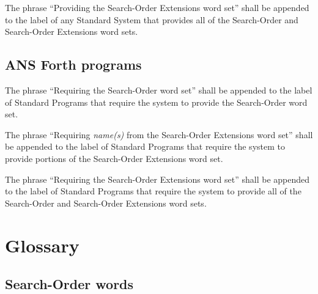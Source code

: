 The phrase ``Providing the Search-Order Extensions word set'' shall
be appended to the label of any Standard System that provides all of
the Search-Order and Search-Order Extensions word sets.

\subsection{ANS Forth programs} %

The phrase ``Requiring the Search-Order word set'' shall be appended
to the label of Standard Programs that require the system to provide
the Search-Order word set.

The phrase ``Requiring \emph{name(s)} from the Search-Order
Extensions word set'' shall be appended to the label of Standard
Programs that require the system to provide portions of the
Search-Order Extensions word set.

The phrase ``Requiring the Search-Order Extensions word set'' shall
be appended to the label of Standard Programs that require the system
to provide all of the Search-Order and Search-Order Extensions word
sets.


\section{Glossary} %

\subsection{Search-Order words} %

